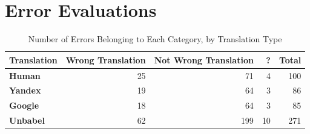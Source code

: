 \chapter{Error Evaluations}
\begin{table}[ht]	
	\centering
	\caption{Number of Errors Belonging to Each Category, by Translation Type}
	\begin{tabular}{lrrrr}
		\toprule
		\textbf{Translation}   &   \textbf{Wrong Translation} &   \textbf{Not Wrong Translation} &   \textbf{?} & \textbf{Total} \\
		\midrule
			\textbf{Human}         &         25 &  71 &  4 &   100 \\
			\textbf{Yandex}        &         19 &  64 &  3 &   86 \\
			\textbf{Google}        &         18 &  64 &  3 &   85 \\
			\textbf{Unbabel}       &         62 &  199 & 10 &  271 \\
		\bottomrule
	\end{tabular} 
	\label{app:error_analysys_error_by_category}
\end{table}



